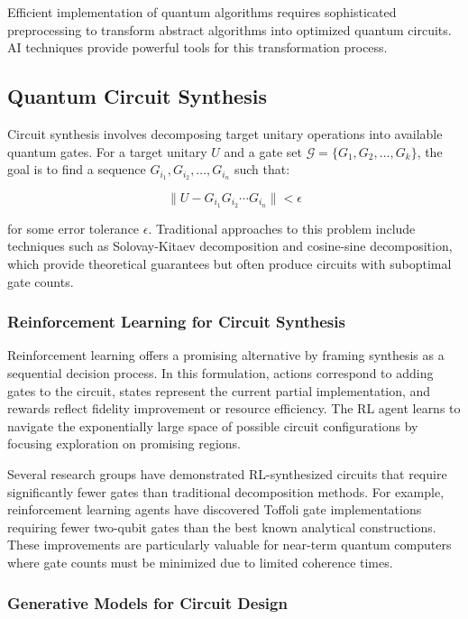Efficient implementation of quantum algorithms requires sophisticated preprocessing to transform abstract algorithms into optimized quantum circuits. AI techniques provide powerful tools for this transformation process.

\subsection{Quantum Circuit Synthesis}

Circuit synthesis involves decomposing target unitary operations into available quantum gates. For a target unitary $U$ and a gate set $\mathcal{G} = \{G_1, G_2, \ldots, G_k\}$, the goal is to find a sequence $G_{i_1}, G_{i_2}, \ldots, G_{i_n}$ such that:

\begin{equation}
\| U - G_{i_1} G_{i_2} \cdots G_{i_n} \| < \epsilon
\end{equation}

for some error tolerance $\epsilon$. Traditional approaches to this problem include techniques such as Solovay-Kitaev decomposition and cosine-sine decomposition, which provide theoretical guarantees but often produce circuits with suboptimal gate counts.

\subsubsection{Reinforcement Learning for Circuit Synthesis}

Reinforcement learning offers a promising alternative by framing synthesis as a sequential decision process. In this formulation, actions correspond to adding gates to the circuit, states represent the current partial implementation, and rewards reflect fidelity improvement or resource efficiency. The RL agent learns to navigate the exponentially large space of possible circuit configurations by focusing exploration on promising regions.

Several research groups have demonstrated RL-synthesized circuits that require significantly fewer gates than traditional decomposition methods. For example, reinforcement learning agents have discovered Toffoli gate implementations requiring fewer two-qubit gates than the best known analytical constructions. These improvements are particularly valuable for near-term quantum computers where gate counts must be minimized due to limited coherence times.

\subsubsection{Generative Models for Circuit Design}

